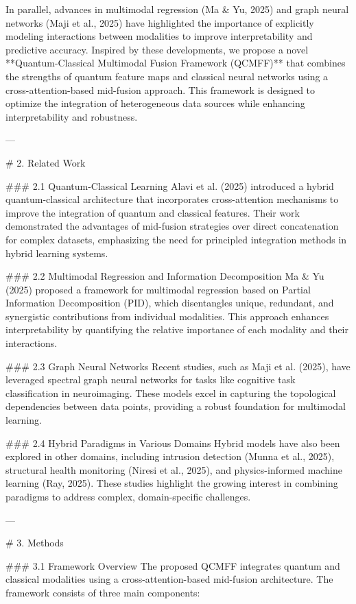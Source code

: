 In parallel, advances in multimodal regression (Ma & Yu, 2025) and graph neural networks (Maji et al., 2025) have highlighted the importance of explicitly modeling interactions between modalities to improve interpretability and predictive accuracy. Inspired by these developments, we propose a novel **Quantum-Classical Multimodal Fusion Framework (QCMFF)** that combines the strengths of quantum feature maps and classical neural networks using a cross-attention-based mid-fusion approach. This framework is designed to optimize the integration of heterogeneous data sources while enhancing interpretability and robustness.

---

# 2. Related Work

### 2.1 Quantum-Classical Learning
Alavi et al. (2025) introduced a hybrid quantum-classical architecture that incorporates cross-attention mechanisms to improve the integration of quantum and classical features. Their work demonstrated the advantages of mid-fusion strategies over direct concatenation for complex datasets, emphasizing the need for principled integration methods in hybrid learning systems.

### 2.2 Multimodal Regression and Information Decomposition
Ma & Yu (2025) proposed a framework for multimodal regression based on Partial Information Decomposition (PID), which disentangles unique, redundant, and synergistic contributions from individual modalities. This approach enhances interpretability by quantifying the relative importance of each modality and their interactions.

### 2.3 Graph Neural Networks
Recent studies, such as Maji et al. (2025), have leveraged spectral graph neural networks for tasks like cognitive task classification in neuroimaging. These models excel in capturing the topological dependencies between data points, providing a robust foundation for multimodal learning.

### 2.4 Hybrid Paradigms in Various Domains
Hybrid models have also been explored in other domains, including intrusion detection (Munna et al., 2025), structural health monitoring (Niresi et al., 2025), and physics-informed machine learning (Ray, 2025). These studies highlight the growing interest in combining paradigms to address complex, domain-specific challenges.

---

# 3. Methods

### 3.1 Framework Overview
The proposed QCMFF integrates quantum and classical modalities using a cross-attention-based mid-fusion architecture. The framework consists of three main components:

